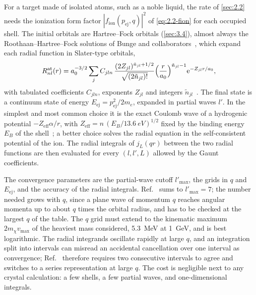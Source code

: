 For a target made of isolated atoms, such as a noble liquid, the rate of \cref{sec:2.2} needs the ionization form factor $|f_{\mathrm{ion}}(p_{\mathrm{ej}},q)|^2$ of \cref{eq:2.2-fion} for each occupied shell. The initial orbitals are Hartree--Fock orbitals (\cref{sec:3.4}), almost always the Roothaan--Hartree--Fock solutions of Bunge and collaborators~\cite{bunge1993roothaan}, which expand each radial function in Slater-type orbitals,
\begin{equation}
  R^{\mathrm{at}}_{nl}(r) = a_0^{-3/2}\sum_j C_{jln}\,\frac{(2Z_{jl})^{\tilde n_{jl}+1/2}}{\sqrt{(2\tilde n_{jl})!}}\Bigl(\frac{r}{a_0}\Bigr)^{\tilde n_{jl}-1}\mathrm{e}^{-Z_{jl}r/a_0} ,
  \label{eq:E.7-sto}
\end{equation}
with tabulated coefficients $C_{jln}$, exponents $Z_{jl}$ and integers $\tilde n_{jl}$~\cite[Eq.~(B33)]{catena2020atomic}. The final state is a continuum state of energy $E_{\mathrm{ej}} = p_{\mathrm{ej}}^2/2m_e$, expanded in partial waves $l'$. In the simplest and most common choice it is the exact Coulomb wave of a hydrogenic potential $-Z_{\mathrm{eff}}\alpha/r$, with $Z_{\mathrm{eff}} = n\,(E_B/\SI{13.6}{eV})^{1/2}$ fixed by the binding energy $E_B$ of the shell~\cite[Eqs.~(B34) and~(B35)]{catena2020atomic}; a better choice solves the radial equation in the self-consistent potential of the ion. The radial integrals of $j_L(qr)$ between the two radial functions are then evaluated for every $(l, l', L)$ allowed by the Gaunt coefficients.

The convergence parameters are the partial-wave cutoff $l'_{\mathrm{max}}$, the grids in $q$ and $E_{\mathrm{ej}}$, and the accuracy of the radial integrals. Ref.~\cite[footnote~11]{catena2020atomic} sums to $l'_{\mathrm{max}} = 7$; the number needed grows with $q$, since a plane wave of momentum $q$ reaches angular momenta up to about $q$ times the orbital radius, and has to be checked at the largest $q$ of the table. The $q$ grid must extend to the kinematic maximum $2m_\chi v_{\mathrm{max}}$ of the heaviest mass considered, \SI{5.3}{MeV} at \SI{1}{GeV}, and is best logarithmic. The radial integrands oscillate rapidly at large $q$, and an integration split into intervals can misread an accidental cancellation over one interval as convergence; Ref.~\cite[Appendix~B\,5]{catena2020atomic} therefore requires two consecutive intervals to agree and switches to a series representation at large $q$. The cost is negligible next to any crystal calculation: a few shells, a few partial waves, and one-dimensional integrals.

